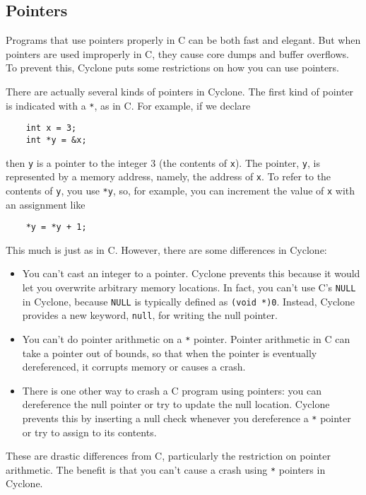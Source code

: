 \subsection{Pointers}

Programs that use pointers properly in C can be both fast and elegant.
But when pointers are used improperly in C, they cause core dumps and
buffer overflows.  To prevent this, Cyclone puts some restrictions on
how you can use pointers.

There are actually several kinds of pointers in Cyclone.  The first
kind of pointer is indicated with a \texttt{*}, as in C.  For example,
if we declare
\begin{verbatim}
    int x = 3;
    int *y = &x;
\end{verbatim}
then \texttt{y} is a pointer to the integer 3 (the contents of
\texttt{x}).  The pointer, \texttt{y}, is represented by a memory
address, namely, the address of \texttt{x}.  To refer to the contents
of \texttt{y}, you use \texttt{*y}, so, for example, you can increment
the value of \texttt{x} with an assignment like
\begin{verbatim}
    *y = *y + 1;
\end{verbatim}

This much is just as in C\@.  However, there are some differences in
Cyclone:
\begin{itemize}
\item You can't cast an integer to a pointer.  Cyclone prevents this
  because it would let you overwrite arbitrary memory locations.  In
  fact, you can't use C's \texttt{NULL} in Cyclone, because
  \texttt{NULL} is typically defined as \texttt{(void *)0}.  Instead,
  Cyclone provides a new keyword, \texttt{null}, for writing the null
  pointer.
\item You can't do pointer arithmetic on a \texttt{*} pointer.
  Pointer arithmetic in C can take a pointer out of bounds, so that
  when the pointer is eventually dereferenced, it corrupts memory or
  causes a crash.
\item There is one other way to crash a C program using pointers: you
  can dereference the null pointer or try to update the null location.
  Cyclone prevents this by inserting a null check whenever you
  dereference a \texttt{*} pointer or try to assign to its contents.
\end{itemize}

These are drastic differences from C, particularly the restriction on
pointer arithmetic.  The benefit is that you can't cause a crash using
\texttt{*} pointers in Cyclone.

